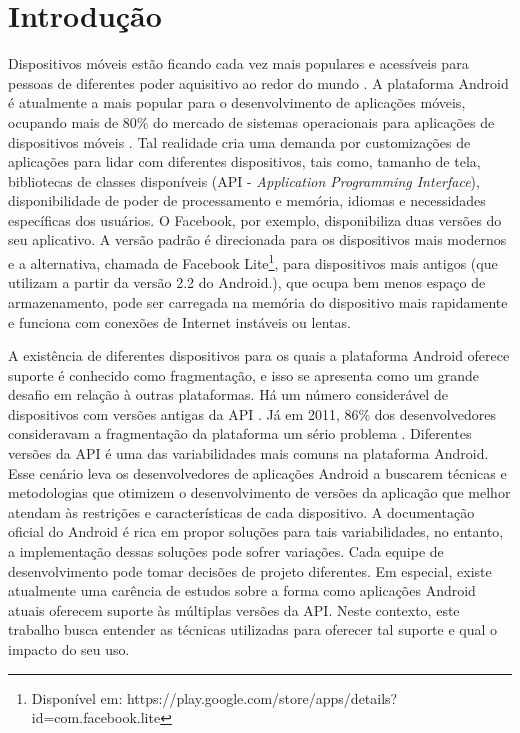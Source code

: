 \chapter{Introdução} \label{ch:introducao}

Dispositivos móveis estão ficando cada vez mais populares e acessíveis para
pessoas de diferentes poder aquisitivo ao redor do mundo \cite{Lhamas2014}.
A plataforma Android é atualmente a mais popular para o desenvolvimento de
aplicações móveis, ocupando mais de 80\% do mercado de sistemas operacionais
para aplicações de dispositivos móveis \cite{jim2014}. Tal realidade cria uma
demanda por customizações de aplicações para lidar com diferentes dispositivos,
tais como, tamanho de tela, bibliotecas de classes 
disponíveis  (API - \textit{Application Programming Interface}),
disponibilidade de poder de processamento e memória, idiomas e
necessidades específicas dos usuários. O Facebook, por exemplo, disponibiliza
duas versões do seu aplicativo. A versão padrão é direcionada para os dispositivos
mais modernos e a alternativa, chamada de Facebook Lite\footnote{Disponível em:
https://play.google.com/store/apps/details?id=com.facebook.lite},
para dispositivos mais antigos (que utilizam a partir da versão 2.2 do Android.),
que ocupa bem menos espaço de armazenamento, pode ser carregada na memória do
dispositivo mais rapidamente e funciona com conexões de Internet instáveis ou lentas.

A existência de diferentes dispositivos para os quais a plataforma Android oferece
suporte é conhecido como fragmentação, e isso se apresenta como um grande desafio
em relação à outras plataformas. Há um número considerável de dispositivos com versões
antigas da API  \cite{Gronli2014}. Já em 2011, 86\% dos desenvolvedores consideravam
a fragmentação da plataforma um sério problema \cite{Elmer-DeWitt2011}.
Diferentes versões da API é uma das variabilidades mais comuns na plataforma Android.
Esse cenário leva os desenvolvedores de aplicações Android a buscarem técnicas e
metodologias que otimizem o desenvolvimento de versões da aplicação que melhor
atendam às restrições e características de cada dispositivo. A documentação oficial
do Android \cite{GuiaAndroid} é rica em propor soluções para tais variabilidades,
no entanto, a implementação dessas soluções pode sofrer variações. Cada equipe
de desenvolvimento pode tomar decisões de projeto diferentes. Em especial, existe
atualmente uma carência de estudos sobre a forma como aplicações Android atuais
oferecem suporte às múltiplas versões da API. Neste contexto, este trabalho busca
entender as técnicas utilizadas para oferecer tal suporte e qual o impacto do seu uso.

